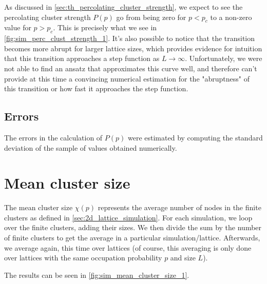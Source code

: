 As discussed in \autoref{sec:th_percolating_cluster_strength}, we expect to see the percolating cluster strength $P(p)$ go from being zero for $p < p_c$ to a non-zero value for $p > p_c$. This is precisely what we see in \autoref{fig:sim_perc_clust_strength_1}. It's also possible to notice that the transition becomes more abrupt for larger lattice sizes, which provides evidence for intuition that this transition approaches a step function as $L \to \infty$.
Unfortunately, we were not able to find an ansatz that approximates this curve well, and therefore can't provide at this time a convincing numerical estimation for the "abruptness" of this transition or how fast it approaches the step function. 


\subsection{Errors}

The errors in the calculation of $P(p)$ were estimated by computing the standard deviation of the sample of values obtained numerically.


\section{Mean cluster size}

The mean cluster size $\chi(p)$ represents the average number of nodes in the finite clusters as defined in \autoref{sec:2d_lattice_simulation}. For each simulation, we loop over the finite clusters, adding their sizes. We then divide the sum by the number of finite clusters to get the average in a particular simulation/lattice. Afterwards, we average again, this time over lattices (of course, this averaging is only done over lattices with the same occupation probability $p$ and size $L$). 

The results can be seen in \autoref{fig:sim_mean_cluster_size_1}.



